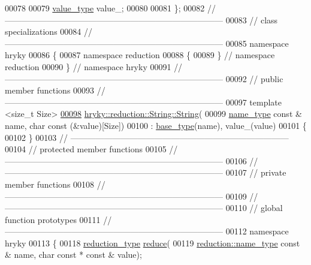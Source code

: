 \begin{DoxyCode}
00078 
00079     \hyperlink{classhryky_1_1_string}{value_type} value\_;
00080 
00081 \};
00082 \textcolor{comment}{//
      ------------------------------------------------------------------------------}
00083 \textcolor{comment}{// class specializations}
00084 \textcolor{comment}{//
      ------------------------------------------------------------------------------}
00085 \textcolor{keyword}{namespace }hryky
00086 \{
00087 \textcolor{keyword}{namespace }reduction
00088 \{
00089 \} \textcolor{comment}{// namespace reduction}
00090 \} \textcolor{comment}{// namespace hryky}
00091 \textcolor{comment}{//
      ------------------------------------------------------------------------------}
00092 \textcolor{comment}{// public member functions}
00093 \textcolor{comment}{//
      ------------------------------------------------------------------------------}
00097 \textcolor{comment}{}\textcolor{keyword}{template} <\textcolor{keywordtype}{size\_t} Size>
\hypertarget{reduction__string_8h_source_l00098}{}\hyperlink{classhryky_1_1reduction_1_1_string_ae51e2574fb2566ea5376429087259257}{00098} \hyperlink{classhryky_1_1reduction_1_1_string_ae696533e5e7ab4ecdc2a15b04acb3122}{hryky::reduction::String::String}(
00099     \hyperlink{classhryky_1_1reduction_1_1_string}{name_type} \textcolor{keyword}{const} & name, \textcolor{keywordtype}{char} \textcolor{keyword}{const} (&value)[Size])
00100     : \hyperlink{classhryky_1_1reduction_1_1_base}{base_type}(name), value\_(value)
00101 \{
00102 \}
00103 \textcolor{comment}{//
      ------------------------------------------------------------------------------}
00104 \textcolor{comment}{// protected member functions}
00105 \textcolor{comment}{//
      ------------------------------------------------------------------------------}
00106 \textcolor{comment}{//
      ------------------------------------------------------------------------------}
00107 \textcolor{comment}{// private member functions}
00108 \textcolor{comment}{//
      ------------------------------------------------------------------------------}
00109 \textcolor{comment}{//
      ------------------------------------------------------------------------------}
00110 \textcolor{comment}{// global function prototypes}
00111 \textcolor{comment}{//
      ------------------------------------------------------------------------------}
00112 \textcolor{keyword}{namespace }hryky
00113 \{
00118     \hyperlink{classhryky_1_1_intrusive_ptr}{reduction_type} \hyperlink{namespacehryky_1_1reduction_a064022926c530d18aeb1b2abdf71800b}{reduce}(
00119         \hyperlink{classhryky_1_1reduction_1_1_string}{reduction::name_type} \textcolor{keyword}{const} & name, \textcolor{keywordtype}{char} \textcolor{keyword}{const} * \textcolor{keyword}{const} & value);

\end{DoxyCode}
